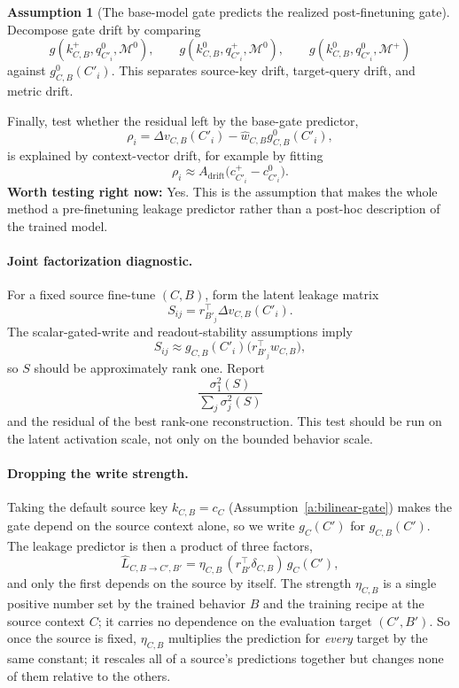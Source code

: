\documentclass[11pt]{article}
\theoremstyle{definition}
\theoremstyle{definition}
\theoremstyle{assumptionstyle}
\newtheorem{assumption}{Assumption}[section]
\newcounter{prediction}
\newcommand{\disp}{\delta_{C,B}}
\begin{document}
\begin{assumption}[The base-model gate predicts the realized post-finetuning gate]
Decompose gate drift by comparing
\[
g(k^+_{C,B},q^0_{C'_i},\mathcal M^0),
\qquad
g(k^0_{C,B},q^+_{C'_i},\mathcal M^0),
\qquad
g(k^0_{C,B},q^0_{C'_i},\mathcal M^+)
\]
against \(g^0_{C,B}(C'_i)\). This separates source-key drift,
target-query drift, and metric drift.

Finally, test whether the residual left by the base-gate predictor,
\[
\rho_i
=
\Delta v_{C,B}(C'_i)
-
\widehat w_{C,B}g^0_{C,B}(C'_i),
\]
is explained by context-vector drift, for example by fitting
\[
\rho_i
\approx
A_{\mathrm{drift}}
\big(c^+_{C'_i}-c^0_{C'_i}\big).
\]
\textbf{Worth testing right now:} Yes. This is the assumption that makes
the whole method a pre-finetuning leakage predictor rather than a post-hoc
description of the trained model.
\end{assumption}


\paragraph{Joint factorization diagnostic.}
For a fixed source fine-tune \((C,B)\), form the latent leakage matrix
\[
S_{ij}
=
r_{B'_j}^{\top}
\Delta v_{C,B}(C'_i).
\]
The scalar-gated-write and readout-stability assumptions imply
\[
S_{ij}
\approx
g_{C,B}(C'_i)
\big(r_{B'_j}^{\top}w_{C,B}\big),
\]
so \(S\) should be approximately rank one. Report
\[
\frac{\sigma_1^2(S)}{\sum_j\sigma_j^2(S)}
\]
and the residual of the best rank-one reconstruction. This test should be run on
the latent activation scale, not only on the bounded behavior scale.

\paragraph{Dropping the write strength.} Taking the default source key $k_{C,B}=c_{C}$ (Assumption~\ref{a:bilinear-gate}) makes the gate depend on the source context alone, so we write $g_{C}(C')$ for $g_{C,B}(C')$. The leakage predictor is then a product of three
factors,
\[
\widehat L_{C,B\to C',B'}
=
\eta_{C,B}\,(r_{B'}^\top \disp)\,g_{C}(C'),
\]
and only the first depends on the source by itself. The strength \(\eta_{C,B}\) is a
single positive number set by the trained behavior \(B\) and the training recipe at the
source context \(C\); it carries no dependence on the evaluation target
\((C',B')\). So once the source is fixed, \(\eta_{C,B}\) multiplies the prediction
for \emph{every} target by the same constant; it rescales all of a source's predictions
together but changes none of them relative to the others.
\end{document}
